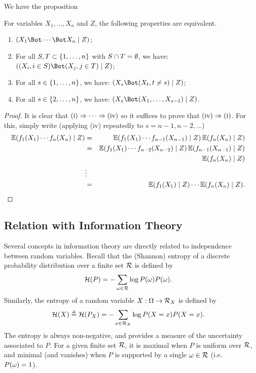 We have the proposition
\begin{proposition}
\label{prop:mut.indep}
For variables $X_1, \ldots, X_n$ and $Z$, the following properties are equivalent.
\begin{enumerate}[label=(\roman*)]
\item $(X_1 \indp \cdots \indp X_n\mid Z)$;
\item For all $S, T \subset \left\{ 1, \ldots, n \right\}$ with $S\cap
  T=\emptyset$, we have:
$\cind{(X_i, i\in S)}{(X_j, j\in T)}{Z}$;
\item For all $s\in \left\{ 1, \ldots, n \right\}$, we have: $\cind{X_s}{(X_t,
t\neq s)}{Z}$;
\item For all $s\in \left\{ 2, \ldots, n \right\}$, we have:
$\cind{X_s}{(X_1,\ldots, X_{s-1})}{Z}$.
\end{enumerate}
\end{proposition}
\begin{proof}
It is clear that $\text{(i)} \Rightarrow \cdots \Rightarrow\text{(iv)}$ so it
suffices to prove that $\text{(iv)} \Rightarrow \text{(i)}$. For this, simply
write (applying (iv) repeatedly to $s = n-1, n-2, \ldots$)
\begin{eqnarray*}
\bm{\mathbb E}(f_1(X_1)\cdots f_n(X_n)\mid Z) &=& \bm{\mathbb E}(f_1(X_1)\cdots f_{n-1}(X_{n-1})\mid Z)\, \bm{\mathbb E}(f_n(X_n) \mid Z) \\
&=& \bm{\mathbb E}(f_1(X_1)\cdots f_{n-2}(X_{n-2})\mid Z)\, \bm{\mathbb E}(f_{n-1}(X_{n-1}) \mid Z)\\
&& \quad \bm{\mathbb E}(f_n(X_n) \mid Z) \\
&\vdots &\\ 
&=& \bm{\mathbb E}(f_1(X_1)\mid Z)\cdots \bm{\mathbb E}(f_n(X_n)\mid Z).
\end{eqnarray*}
\end{proof}

\subsection{Relation with Information Theory}

Several concepts in information theory are directly related to
independence between random variables. Recall that the (Shannon) entropy of a discrete
probability distribution over a finite set ${\mathcal R}$
is defined by 
\begin{equation}
\label{eq:entr.1}
\mathcal H(P) = -\sum_{\omega\in {\mathcal R}} \log P(\omega) P(\omega).
\end{equation}
Similarly, the entropy of a random variable $X:\Omega \to {\mathcal R}_X$ is defined by
\begin{equation}
\label{eq:entr.2}
\mathcal H(X) \stackrel{{\scriptscriptstyle \Delta}}{=} \mathcal H(P_X) = -\sum_{x\in {\mathcal R}_X} \log P(X=x) P(X=x).
\end{equation}
The entropy is always non-negative, and provides a  measure of the
uncertainty associated to $P$. For a given finite set ${\mathcal R}$,
it is maximal when $P$ is uniform over ${\mathcal R}$, and minimal (and vanishes) when $P$ is
supported by a single $\omega\in {\mathcal R}$ (i.e. $P(\omega) = 1$). 

